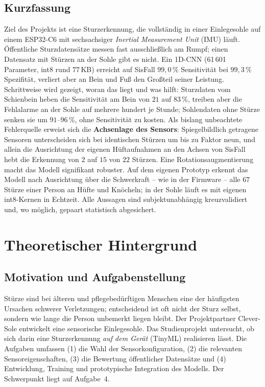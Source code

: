 \documentclass[11pt,a4paper,oneside,parskip=half,open=any,
               numbers=noenddot,listof=totoc,bibliography=totoc]{scrreprt}
\begin{document}
\section*{Kurzfassung}
Ziel des Projekts ist eine Sturzerkennung, die vollständig in einer
Einlegesohle auf einem ESP32-C6 mit sechsachsiger \emph{Inertial
Measurement Unit} (IMU) läuft. Öffentliche Sturzdatensätze messen fast
ausschließlich am Rumpf; einen Datensatz mit Stürzen an der Sohle gibt es
nicht. Ein 1D-CNN (61\,601 Parameter, int8 rund $77$\,KB) erreicht auf
SisFall $99{,}0\,\%$ Sensitivität bei $99{,}3\,\%$ Spezifität, verliert
aber an Bein und Fuß den Großteil seiner Leistung. Schrittweise wird
gezeigt, woran das liegt und was hilft: Sturzdaten vom Schienbein heben
die Sensitivität am Bein von $21$ auf $83\,\%$, treiben aber die
Fehlalarme an der Sohle auf mehrere hundert je Stunde; Sohlendaten ohne
Stürze senken sie um $91$--$96\,\%$, ohne Sensitivität zu kosten. Als bislang unbeachtete Fehlerquelle erweist sich die
\textbf{Achsenlage des Sensors}: Spiegelbildlich getragene Sensoren
unterscheiden sich bei identischen Stürzen um bis zu Faktor neun, und
allein die Ausrichtung der eigenen Hüftaufnahmen an den Achsen von
SisFall hebt die Erkennung von $2$ auf $15$ von $22$ Stürzen.
Eine Rotationsaugmentierung macht das Modell signifikant robuster. Auf
dem eigenen Prototyp erkennt das Modell nach Ausrichtung über die
Schwerkraft -- wie in der Firmware -- alle $67$ Stürze einer Person an
Hüfte und Knöcheln; in der Sohle läuft es mit eigenen int8-Kernen
in Echtzeit. Alle Aussagen sind subjektunabhängig
kreuzvalidiert und, wo möglich, gepaart statistisch abgesichert.

\vspace{0.3cm}
{\small\setcounter{tocdepth}{1}\tableofcontents}
\clearpage
{}

\chapter{Theoretischer Hintergrund}
\label{ch:theorie}

\section{Motivation und Aufgabenstellung}
Stürze sind bei älteren und pflegebedürftigen Menschen eine der
häufigsten Ursachen schwerer Verletzungen; entscheidend ist oft nicht
der Sturz selbst, sondern wie lange die Person unbemerkt liegen bleibt.
Der Projektpartner Clever-Sole entwickelt eine sensorische Einlegesohle.
Das Studienprojekt untersucht, ob sich darin eine Sturzerkennung
\emph{auf dem Gerät} (TinyML) realisieren lässt. Die Aufgaben umfassen
(1) die Wahl der Sensorkonfiguration, (2) die relevanten
Sensoreigenschaften, (3) die Bewertung öffentlicher Datensätze und
(4) Entwicklung, Training und prototypische Integration des Modells.
Der Schwerpunkt liegt auf Aufgabe~4.
\end{document}
